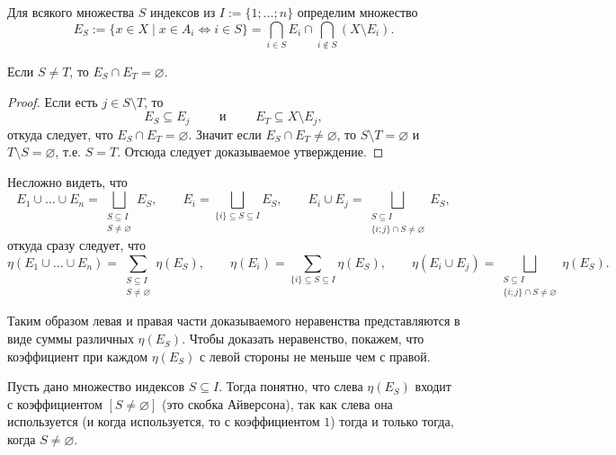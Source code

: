 \documentclass[12pt,a4paper]{article}
\begin{document}
    \begin{enumproblem}
        Для всякого множества $S$ индексов из $I := \{1; \dots; n\}$ определим множество
        \[E_S := \{x \in X \mid x \in A_i \Leftrightarrow i \in S\} = \bigcap_{i \in S} E_i \cap \bigcap_{i \notin S} (X \setminus E_i).\]
        
        \begin{lemma}
            Если $S \neq T$, то $E_S \cap E_T = \varnothing$.
        \end{lemma}

        \begin{proof}
            Если есть $j \in S \setminus T$, то
            \[E_S \subseteq E_j \qquad \text{ и } \qquad E_T \subseteq X \setminus E_j,\]
            откуда следует, что $E_S \cap E_T = \varnothing$. Значит если $E_S \cap E_T \neq \varnothing$, то $S \setminus T = \varnothing$ и $T \setminus S = \varnothing$, т.е. $S = T$. Отсюда следует доказываемое утверждение.
        \end{proof}

        Несложно видеть, что
        \[
            E_1 \cup \dots \cup E_n = \bigsqcup_{\substack{S \subseteq I\\ S \neq \varnothing}} E_S,
            \qquad
            E_i = \bigsqcup_{\{i\} \subseteq S \subseteq I} E_S,
            \qquad
            E_i \cup E_j = \bigsqcup_{\substack{S \subseteq I\\ \{i; j\} \cap S \neq \varnothing}} E_S,
        \]
        откуда сразу следует, что
        \[
            \eta(E_1 \cup \dots \cup E_n) = \sum_{\substack{S \subseteq I\\ S \neq \varnothing}} \eta(E_S),
            \qquad
            \eta(E_i) = \sum_{\{i\} \subseteq S \subseteq I} \eta(E_S),
            \qquad
            \eta(E_i \cup E_j) = \bigsqcup_{\substack{S \subseteq I\\ \{i; j\} \cap S \neq \varnothing}} \eta(E_S).
        \]

        Таким образом левая и правая части доказываемого неравенства представляются в виде суммы различных $\eta(E_S)$. Чтобы доказать неравенство, покажем, что коэффициент при каждом $\eta(E_S)$ с левой стороны не меньше чем с правой.

        Пусть дано множество индексов $S \subseteq I$. Тогда понятно, что слева $\eta(E_S)$ входит с коэффициентом $[S \neq \varnothing]$ (это скобка Айверсона), так как слева она используется (и когда используется, то с коэффициентом $1$) тогда и только тогда, когда $S \neq \varnothing$.
        

\end{enumproblem}
\end{document}
